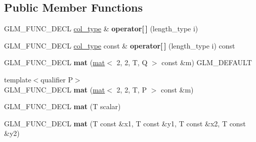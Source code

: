 \subsection*{Public Member Functions}
\begin{DoxyCompactItemize}
\item 
\mbox{\label{structglm_1_1mat_3_012_00_012_00_01T_00_01Q_01_4_a3412817642a709f843240b51f05514a5}} 
G\+L\+M\+\_\+\+F\+U\+N\+C\+\_\+\+D\+E\+CL \hyperlink{structglm_1_1vec_3_012_00_01T_00_01Q_01_4}{col\+\_\+type} \& {\bfseries operator\mbox{[}$\,$\mbox{]}} (length\+\_\+type i)
\item 
\mbox{\label{structglm_1_1mat_3_012_00_012_00_01T_00_01Q_01_4_a06ff5b61af6353d73db79acd46534b0c}} 
G\+L\+M\+\_\+\+F\+U\+N\+C\+\_\+\+D\+E\+CL \hyperlink{structglm_1_1vec_3_012_00_01T_00_01Q_01_4}{col\+\_\+type} const  \& {\bfseries operator\mbox{[}$\,$\mbox{]}} (length\+\_\+type i) const
\item 
\mbox{\label{structglm_1_1mat_3_012_00_012_00_01T_00_01Q_01_4_af0b476c8ab1075e9efd87d30c5c99bd8}} 
G\+L\+M\+\_\+\+F\+U\+N\+C\+\_\+\+D\+E\+CL {\bfseries mat} (\hyperlink{structglm_1_1mat}{mat}$<$ 2, 2, T, Q $>$ const \&m) G\+L\+M\+\_\+\+D\+E\+F\+A\+U\+LT
\item 
\mbox{\label{structglm_1_1mat_3_012_00_012_00_01T_00_01Q_01_4_a783ca53648348b53cdb862ee20e3c36d}} 
{\footnotesize template$<$qualifier P$>$ }\\G\+L\+M\+\_\+\+F\+U\+N\+C\+\_\+\+D\+E\+CL {\bfseries mat} (\hyperlink{structglm_1_1mat}{mat}$<$ 2, 2, T, P $>$ const \&m)
\item 
\mbox{\label{structglm_1_1mat_3_012_00_012_00_01T_00_01Q_01_4_a58a771fe81b190444b0743aac7072266}} 
G\+L\+M\+\_\+\+F\+U\+N\+C\+\_\+\+D\+E\+CL {\bfseries mat} (T scalar)
\item 
\mbox{\label{structglm_1_1mat_3_012_00_012_00_01T_00_01Q_01_4_a6ac2e228714d5fea30ad1a0157987502}} 
G\+L\+M\+\_\+\+F\+U\+N\+C\+\_\+\+D\+E\+CL {\bfseries mat} (T const \&x1, T const \&y1, T const \&x2, T const \&y2)

\end{DoxyCompactItemize}
